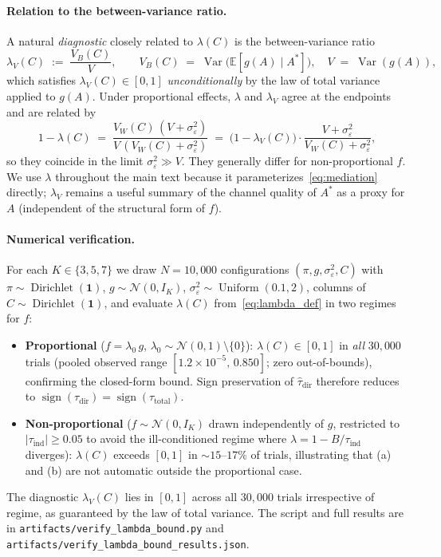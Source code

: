 \paragraph{Relation to the between-variance ratio.}
A natural \emph{diagnostic} closely related to $\lambda(C)$ is the between-variance ratio
\begin{equation}
\label{eq:vb_ratio}
  \lambda_V(C) \;:=\; \frac{V_B(C)}{V},\qquad V_B(C)\;=\;\operatorname{Var}\!\bigl(\mathbb{E}[g(A)\mid A^*]\bigr),\quad V\;=\;\operatorname{Var}(g(A)),
\end{equation}
which satisfies $\lambda_V(C)\in[0,1]$ \emph{unconditionally} by the law of total variance applied to $g(A)$. Under proportional effects, $\lambda$ and $\lambda_V$ agree at the endpoints and are related by
\[
  1-\lambda(C)\;=\;\frac{V_W(C)\,(V+\sigma_\varepsilon^2)}{V\,(V_W(C)+\sigma_\varepsilon^2)}\;=\;\bigl(1-\lambda_V(C)\bigr)\cdot\frac{V+\sigma_\varepsilon^2}{V_W(C)+\sigma_\varepsilon^2},
\]
so they coincide in the limit $\sigma_\varepsilon^2\gg V$. They generally differ for non-proportional $f$. We use $\lambda$ throughout the main text because it parameterizes~\eqref{eq:mediation} directly; $\lambda_V$ remains a useful summary of the channel quality of $A^*$ as a proxy for $A$ (independent of the structural form of $f$).

\paragraph{Numerical verification.}
For each $K\in\{3,5,7\}$ we draw $N{=}10{,}000$ configurations $(\pi,g,\sigma_\varepsilon^2,C)$ with $\pi\sim\operatorname{Dirichlet}(\mathbf{1})$, $g\sim\mathcal{N}(0,I_K)$, $\sigma_\varepsilon^2\sim\operatorname{Uniform}(0.1,2)$, columns of $C\sim\operatorname{Dirichlet}(\mathbf{1})$, and evaluate $\lambda(C)$ from~\eqref{eq:lambda_def} in two regimes for $f$:
\begin{itemize}\itemsep0pt
\item \textbf{Proportional} ($f=\lambda_0\,g$, $\lambda_0\sim\mathcal{N}(0,1)\!\setminus\!\{0\}$): $\lambda(C)\in[0,1]$ in \emph{all} $30{,}000$ trials (pooled observed range $[1.2{\times}10^{-5},\,0.850]$; zero out-of-bounds), confirming the closed-form bound. Sign preservation of $\hat\tau_{\mathrm{dir}}$ therefore reduces to $\operatorname{sign}(\tau_{\mathrm{dir}})=\operatorname{sign}(\tau_{\mathrm{total}})$.
\item \textbf{Non-proportional} ($f\sim\mathcal{N}(0,I_K)$ drawn independently of $g$, restricted to $|\tau_{\mathrm{ind}}|\geq 0.05$ to avoid the ill-conditioned regime where $\lambda{=}1{-}B/\tau_{\mathrm{ind}}$ diverges): $\lambda(C)$ exceeds $[0,1]$ in $\sim15$--$17\%$ of trials, illustrating that (a) and (b) are not automatic outside the proportional case.
\end{itemize}
The diagnostic $\lambda_V(C)$ lies in $[0,1]$ across all $30{,}000$ trials irrespective of regime, as guaranteed by the law of total variance. The script and full results are in \texttt{artifacts/verify\_lambda\_bound.py} and \texttt{artifacts/verify\_lambda\_bound\_results.json}.

